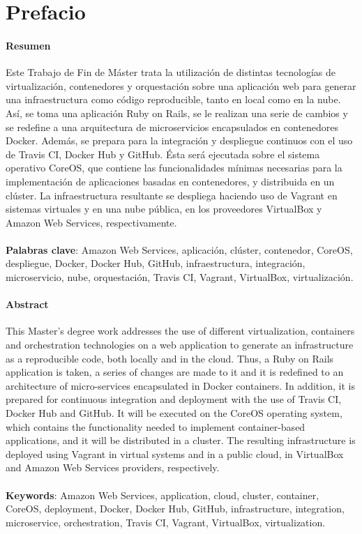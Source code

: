 \chapter{Prefacio}

\subsubsection{Resumen}
Este Trabajo de Fin de Máster trata la utilización de distintas tecnologías de virtualización, contenedores y orquestación sobre una aplicación web para generar una infraestructura como código reproducible, tanto en local como en la nube. Así, se toma una aplicación Ruby on Rails, se le realizan una serie de cambios y se redefine a una arquitectura de microservicios encapsulados en contenedores Docker. Además, se prepara para la integración y despliegue continuos con el uso de Travis CI, Docker Hub y GitHub. Ésta será ejecutada sobre el sistema operativo CoreOS, que contiene las funcionalidades mínimas necesarias para la implementación de aplicaciones basadas en contenedores, y distribuida en un clúster. La infraestructura resultante se despliega haciendo uso de Vagrant en sistemas virtuales y en una nube pública, en los proveedores VirtualBox y Amazon Web Services, respectivamente. 
\\
\\
\textbf{Palabras clave}: Amazon Web Services, aplicación, clúster, contenedor, CoreOS, despliegue, Docker, Docker Hub, GitHub, infraestructura, integración, microservicio, nube, orquestación, Travis CI, Vagrant, VirtualBox, virtualización.

\subsubsection{Abstract}
This Master's degree work addresses the use of different virtualization, containers and orchestration technologies on a web application to generate an infrastructure as a reproducible code, both locally and in the cloud. Thus, a Ruby on Rails application is taken, a series of changes are made to it and it is redefined to an architecture of micro-services encapsulated in Docker containers. In addition, it is prepared for continuous integration and deployment with the use of Travis CI, Docker Hub and GitHub. It will be executed on the CoreOS operating system, which contains the functionality needed to implement container-based applications, and it will be distributed in a cluster. The resulting infrastructure is deployed using Vagrant in virtual systems and in a public cloud, in VirtualBox and Amazon Web Services providers, respectively.
\\
\\
\textbf{Keywords}: Amazon Web Services, application, cloud, cluster, container, CoreOS, deployment, Docker, Docker Hub, GitHub, infrastructure, integration, microservice, orchestration, Travis CI, Vagrant, VirtualBox, virtualization.